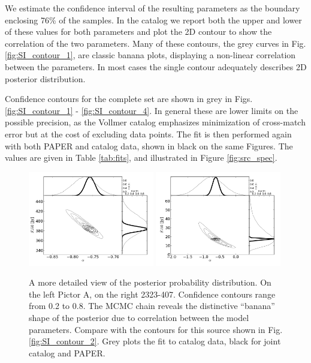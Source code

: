 \documentclass[preprint]{aastex}
\begin{document}
We estimate the confidence interval of the resulting parameters as the boundary
enclosing 76\% of the samples. In the catalog we report both the upper and
lower of these values for both parameters and plot the 2D contour to show the
correlation of the two parameters. Many of these contours, the grey curves in
Fig. \ref{fig:SI_contour_1}, are classic banana plots, displaying a non-linear
correlation between the parameters.    In most cases the single contour
adequately describes 2D posterior distribution.

Confidence contours for
the complete set are shown in grey in Figs. \ref{fig:SI_contour_1} -
\ref{fig:SI_contour_4}.  In general these are lower limits on the possible
precision, as the Vollmer catalog emphasizes minimization of cross-match error
but at the cost of excluding data points.  The fit is then performed again with
both PAPER and catalog data, shown in black on the same Figures. The values are
given in Table \ref{tab:fits}, and
illustrated in Figure \ref{fig:src_spec}.  






\begin{figure}[htbp]
\includegraphics[width=0.49\textwidth]{plots/pic_trace_hist.png}
\includegraphics[width=0.49\textwidth]{plots/2323-407_trace_hist.png}
\caption{
A more detailed view of the posterior probability distribution. On the left
Pictor A, on the right 2323-407. Confidence contours range from 0.2 to 0.8. The MCMC
chain reveals the distinctive ``banana'' shape of the posterior
due to correlation between the model parameters.
Compare with the contours for this source shown in Fig. \ref{fig:SI_contour_2}.
Grey plots the fit to catalog data, black for joint catalog and PAPER.
}
\end{figure}
\end{document}
